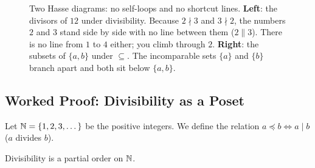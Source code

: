 \begin{figure}[htbp]
\caption{Two Hasse diagrams: no self-loops and no shortcut lines. \textbf{Left}: the divisors of $12$ under divisibility. Because $2 \nmid 3$ and $3 \nmid 2$, the numbers $2$ and $3$ stand side by side with no line between them ($2 \parallel 3$). There is no line from $1$ to $4$ either; you climb through $2$. \textbf{Right}: the subsets of $\{a, b\}$ under $\subseteq$. The incomparable sets $\{a\}$ and $\{b\}$ branch apart and both sit below $\{a, b\}$.}
\label{16:fig-hasse-diagrams}
\end{figure}

\subsection{Worked Proof: Divisibility as a Poset}

Let $\mathbb{N} = \{1, 2, 3, \dots\}$ be the positive integers. We define the relation $a \preceq b \iff a \mid b$ ($a$ divides $b$).

\begin{theorem}
Divisibility is a partial order on $\mathbb{N}$.
\end{theorem}

